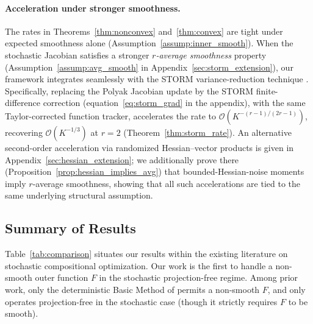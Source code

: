 \documentclass{article}
\def\eqref#1{equation~\ref{#1}}
\begin{document}
\paragraph{Acceleration under stronger smoothness.}
The rates in Theorems~\ref{thm:nonconvex} and~\ref{thm:convex} are tight under expected smoothness alone (Assumption~\ref{assump:inner_smooth}). When the stochastic Jacobian satisfies a stronger \emph{$r$-average smoothness} property (Assumption~\ref{assump:avg_smooth} in Appendix~\ref{sec:storm_extension}), our framework integrates seamlessly with the STORM variance-reduction technique \citep{cutkosky2019momentum, hassani2020stochastic}. Specifically, replacing the Polyak Jacobian update by the STORM finite-difference correction (\eqref{eq:storm_grad} in the appendix), with the same Taylor-corrected function tracker, accelerates the rate to $\mathcal{O}(K^{-(r-1)/(2r-1)})$, recovering $\mathcal{O}(K^{-1/3})$ at $r = 2$ (Theorem~\ref{thm:storm_rate}). An alternative second-order acceleration via randomized Hessian--vector products is given in Appendix~\ref{sec:hessian_extension}; we additionally prove there (Proposition~\ref{prop:hessian_implies_avg}) that bounded-Hessian-noise moments imply $r$-average smoothness, showing that all such accelerations are tied to the same underlying structural assumption.

\subsection{Summary of Results}

Table~\ref{tab:comparison} situates our results within the existing literature on stochastic compositional optimization. Our work is the first to handle a non-smooth outer function $F$ in the stochastic projection-free regime. Among prior work, only the deterministic Basic Method of \citet{vladarean2023first} permits a non-smooth $F$, and only \citet{xiao2022projection} operates projection-free in the stochastic case (though it strictly requires $F$ to be smooth).
\end{document}
